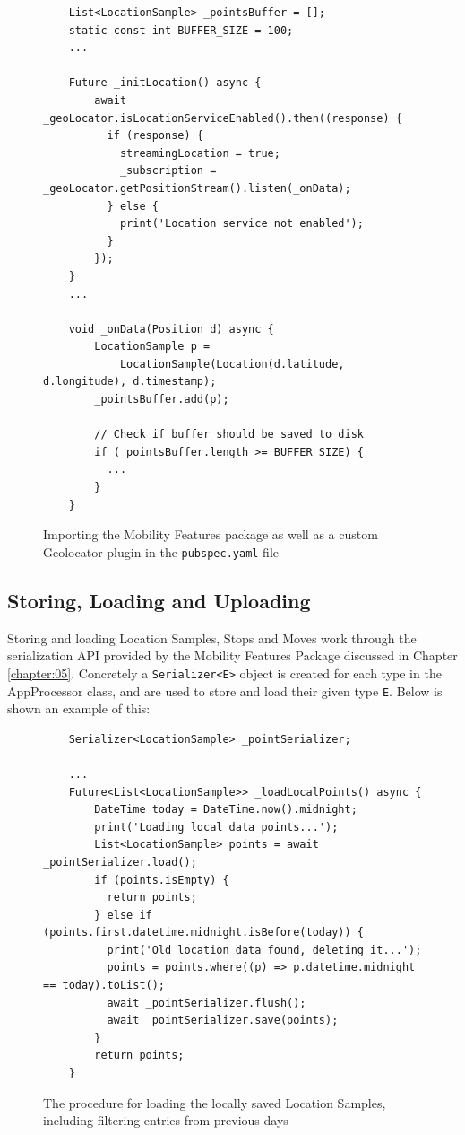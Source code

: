 \begin{figure}
    \centering
    \begin{verbatim}
    List<LocationSample> _pointsBuffer = [];
    static const int BUFFER_SIZE = 100;
    ...
    
    Future _initLocation() async {
        await _geoLocator.isLocationServiceEnabled().then((response) {
          if (response) {
            streamingLocation = true;
            _subscription = _geoLocator.getPositionStream().listen(_onData);
          } else {
            print('Location service not enabled');
          }
        });
    }
    ...
    
    void _onData(Position d) async {
        LocationSample p =
            LocationSample(Location(d.latitude, d.longitude), d.timestamp);
        _pointsBuffer.add(p);
    
        // Check if buffer should be saved to disk
        if (_pointsBuffer.length >= BUFFER_SIZE) {
          ...
        }
    }
    \end{verbatim}
    \caption{Importing the Mobility Features package as well as a custom Geolocator plugin in the \verb|pubspec.yaml| file}
    \label{fig:import-package}
\end{figure}



\subsection{Storing, Loading and Uploading}
Storing and loading Location Samples, Stops and Moves work through the serialization API provided by the Mobility Features Package discussed in Chapter \ref{chapter:05}. Concretely a \verb|Serializer<E>| object is created for each type in the AppProcessor class, and are used to store and load their given type \verb|E|. Below is shown an example of this:



\begin{figure}
    \centering
    \begin{verbatim}
    Serializer<LocationSample> _pointSerializer;
    
    ...
    Future<List<LocationSample>> _loadLocalPoints() async {
        DateTime today = DateTime.now().midnight;
        print('Loading local data points...');
        List<LocationSample> points = await _pointSerializer.load();
        if (points.isEmpty) {
          return points;
        } else if (points.first.datetime.midnight.isBefore(today)) {
          print('Old location data found, deleting it...');
          points = points.where((p) => p.datetime.midnight == today).toList();
          await _pointSerializer.flush();
          await _pointSerializer.save(points);
        }
        return points;
    }
    \end{verbatim}
    \caption{The procedure for loading the locally saved Location Samples, including filtering entries from previous days}
    \label{fig:points-serialization}
\end{figure}


